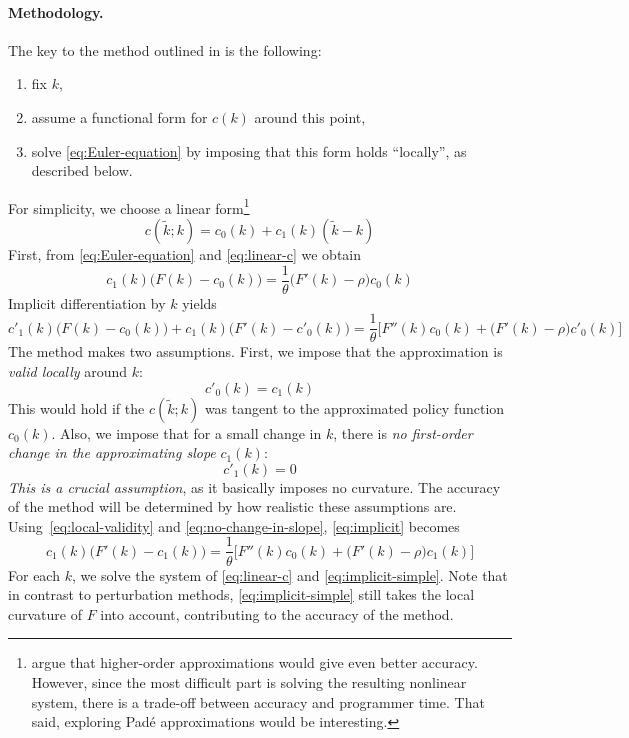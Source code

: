 \documentclass[a4paper,11pt]{article}
\newcommand{\tk}{\tilde{k}}
\begin{document}
\paragraph{Methodology.} The key to the method outlined in \textcite{den2015exact} is the following:
\begin{enumerate}
\item fix $k$,
\item assume a functional form for $c(k)$ around this point,
\item solve \eqref{eq:Euler-equation} by imposing that this form holds ``locally'', as described below.
\end{enumerate}
For simplicity, we choose a linear form\footnote{\textcite{den2015exact} argue that higher-order approximations would give even better accuracy. However, since the most difficult part is solving the resulting nonlinear system, there is a trade-off between accuracy and programmer time. That said, exploring Padé approximations would be interesting.}
\begin{equation}
  \label{eq:linear-c}
  c(\tk; k) = c_0(k) + c_1(k)(\tk-k)
\end{equation}
First, from \eqref{eq:Euler-equation} and \eqref{eq:linear-c} we obtain
\begin{equation}
  \label{eq:linear-Euler}
  c_1(k)\bigl( F(k) - c_0(k) \bigr) = \frac{1}{\theta}\bigl( F'(k) - \rho \bigr) c_0(k)
\end{equation}
Implicit differentiation by $k$ yields
\begin{equation}
  \label{eq:implicit}
  c'_1(k)\bigl( F(k) - c_0(k) \bigr) + c_1(k)\bigl( F'(k) - c'_0(k) \bigr) =
  \frac{1}{\theta}\biggl[ F''(k) c_0(k) + \bigl( F'(k) - \rho \bigr) c'_0(k) \biggr]
\end{equation}
The method makes two assumptions. First, we impose that the approximation is \emph{valid locally} around $k$:
\begin{equation}
  \label{eq:local-validity}
  c'_0(k) = c_1(k)
\end{equation}
This would hold if the $c(\tk;k)$ was tangent to the approximated policy function $c_0(k)$. Also, we impose that for a small change in $k$, there is \emph{no first-order change in the approximating slope} $c_1(k)$:
\begin{equation}
  \label{eq:no-change-in-slope}
  c'_1(k) = 0
\end{equation}
\emph{This is a crucial assumption}, as it basically imposes no curvature. The accuracy of the method will be determined by how realistic these assumptions are. Using~\eqref{eq:local-validity} and \eqref{eq:no-change-in-slope}, \eqref{eq:implicit} becomes
\begin{equation}
  \label{eq:implicit-simple}
  c_1(k)\bigl( F'(k) - c_1(k) \bigr) = \frac{1}{\theta}\biggl[ F''(k) c_0(k) + \bigl( F'(k) - \rho \bigr) c_1(k) \biggr]
\end{equation}
For each $k$, we solve the system of \eqref{eq:linear-c} and \eqref{eq:implicit-simple}.
Note that in contrast to perturbation methods, \eqref{eq:implicit-simple} still takes the local curvature of $F$ into account, contributing to the accuracy of the method.
\end{document}
